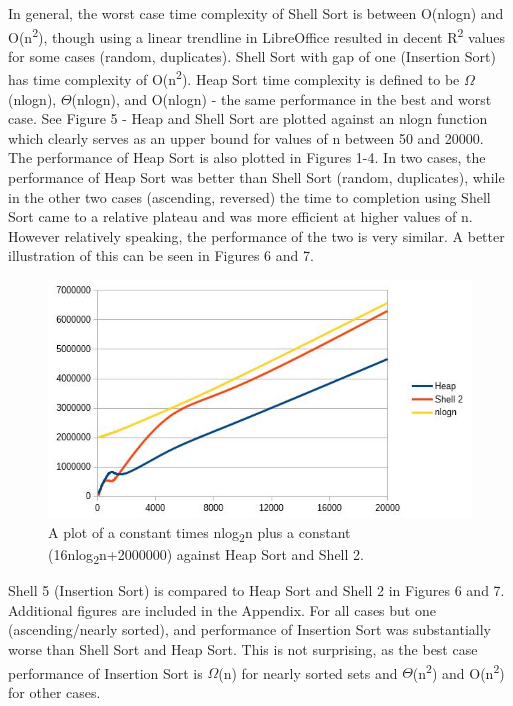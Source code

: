 \documentclass[12pt, titlepage]{article}
\begin{document}
In general, the worst case time complexity of Shell Sort is between O(nlogn) and O(n\textsuperscript{2}), though using a linear trendline in LibreOffice resulted in decent R\textsuperscript{2} values for some cases (random, duplicates). Shell Sort with gap of one (Insertion Sort) has time complexity of O(n\textsuperscript{2}). Heap Sort time complexity is defined to be $\Omega$(nlogn), $\Theta$(nlogn), and O(nlogn) - the same performance in the best and worst case. See Figure 5 - Heap and Shell Sort are plotted against an nlogn function which clearly serves as an upper bound for values of n between 50 and 20000. The performance of Heap Sort is also plotted in Figures 1-4. In two cases, the performance of Heap Sort was better than Shell Sort (random, duplicates), while in the other two cases (ascending, reversed) the time to completion using Shell Sort came to a relative plateau and was more efficient at higher values of n. However relatively speaking, the performance of the two is very similar. A better illustration of this can be seen in Figures 6 and 7.

\begin{figure} [!htbp]
	\centering
	\includegraphics[width=5in]{nlogn}
	\caption{A plot of a constant times nlog\textsubscript{2}n plus a constant (16nlog\textsubscript{2}n+2000000) against Heap Sort and Shell 2.}
\end{figure}

Shell 5 (Insertion Sort) is compared to Heap Sort and Shell 2 in Figures 6 and 7. Additional figures are included in the Appendix. For all cases but one (ascending/nearly sorted), and performance of Insertion Sort was substantially worse than Shell Sort and Heap Sort. This is not surprising, as the best case performance of Insertion Sort is $\Omega$(n) for nearly sorted sets and $\Theta$(n\textsuperscript{2}) and O(n\textsuperscript{2}) for other cases.
\end{document}
